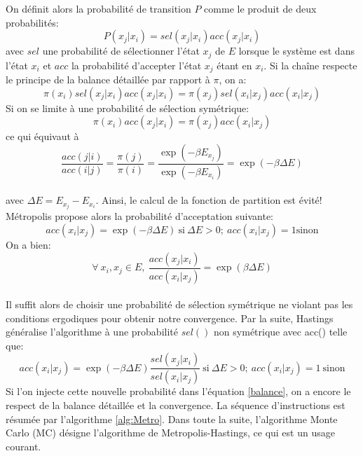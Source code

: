 On définit alors la probabilité de transition $P$ comme le produit de deux probabilités:
\begin{equation}
  \label{decomp_Metro}
P (x_j|x_i) = sel(x_j|x_i)acc(x_j|x_i)
\end{equation}
avec $sel$ une probabilité de sélectionner l'état $x_j$ de $E$ lorsque le système est dans l'état $x_i$ et $acc$ la probabilité d'accepter l'état $x_j$ étant en $x_i$. Si la chaîne respecte le principe de la balance détaillée par rapport à $\pi$, on a:
\begin{equation}
  \label{balance}
\pi(x_i)sel(x_j|x_i)acc(x_j|x_i) = \pi(x_j)sel(x_i|x_j)acc(x_i|x_j) 
\end{equation}
Si on se limite à une probabilité de sélection symétrique:
\begin{equation}
    \label{bd_Metropolis}
\pi(x_i)acc(x_j|x_i) = \pi(x_j)acc(x_i|x_j) 
\end{equation}
ce qui équivaut à
\begin{equation}
\frac{acc(j|i)}{acc(i|j)} =\frac{\pi(j)}{\pi(i)} = \frac{\exp(-\beta E_{x_j})}{\exp(-\beta E_{x_i})} = \exp(-\beta \Delta E) 
\end{equation}\\
avec $\Delta E =  E_{x_j} - E_{x_i}$. Ainsi, le calcul de la fonction de partition est évité! Métropolis propose alors la probabilité d'acceptation suivante: 
\begin{equation}
acc(x_i|x_j) = \exp(- \beta \Delta E)\ \text{si}\ \Delta E >0;\ acc(x_i|x_j)=1 \text{sinon}
\end{equation}
On a bien: 
\begin{equation}
\forall\ x_i, x_j \in E,\ \frac{acc(x_j|x_i)}{acc(x_i|x_j)} = \exp(\beta \Delta E)
\end{equation}\\
Il suffit alors de choisir une probabilité de sélection symétrique ne violant pas les conditions ergodiques pour obtenir notre convergence. Par la suite, Hastings généralise l'algorithme à une probabilité $sel()$ non symétrique avec acc() telle que:
\begin{equation}\label{eq:Hasting}
acc(x_i|x_j) = \exp(-\beta \Delta E) \frac{sel(x_j|x_i)}{sel(x_i|x_j)}\ \text{si}\ \Delta E >0;\ acc(x_i|x_j)=1\ \text{sinon}
\end{equation}
Si l'on injecte cette nouvelle probabilité dans l'équation \ref{balance}, on a encore le respect de la balance détaillée et la convergence. La séquence d'instructions est résumée par l'algorithme \ref{alg:Metro}. Dans toute la suite, l'algorithme Monte Carlo (MC) désigne l'algorithme de Metropolis-Hastings, ce qui est un usage courant.

